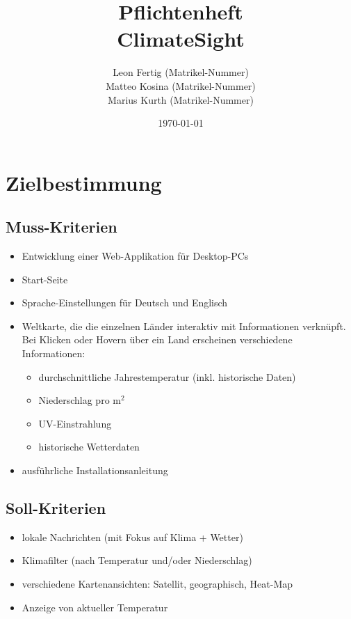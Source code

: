 \documentclass[a4paper]{scrreprt}
\begin{document}
 
\title{Pflichtenheft\\\glqq ClimateSight\grqq}
\author{Leon Fertig (Matrikel-Nummer)\\Matteo Kosina (Matrikel-Nummer) \\Marius Kurth (Matrikel-Nummer)}
\date{\today}
\maketitle


\tableofcontents
 
\chapter{Zielbestimmung}
\section{Muss-Kriterien}
\begin{itemize}
    \item Entwicklung einer Web-Applikation für Desktop-PCs
    \item Start-Seite
    \item Sprache-Einstellungen für Deutsch und Englisch
    \item Weltkarte, die die einzelnen Länder interaktiv mit Informationen verknüpft. Bei Klicken oder Hovern über ein Land erscheinen verschiedene Informationen:
    \begin{itemize}
        \item durchschnittliche Jahrestemperatur (inkl. historische Daten)
        \item Niederschlag pro m$^2$
        \item UV-Einstrahlung
        \item historische Wetterdaten
    \end{itemize}
    \item ausführliche Installationsanleitung
\end{itemize}

\section{Soll-Kriterien}
\begin{itemize}
    \item lokale Nachrichten (mit Fokus auf Klima + Wetter)
    \item Klimafilter (nach Temperatur und/oder Niederschlag)
    \item verschiedene Kartenansichten: Satellit, geographisch, Heat-Map
    \item Anzeige von aktueller Temperatur
\end{itemize}
\end{document}
